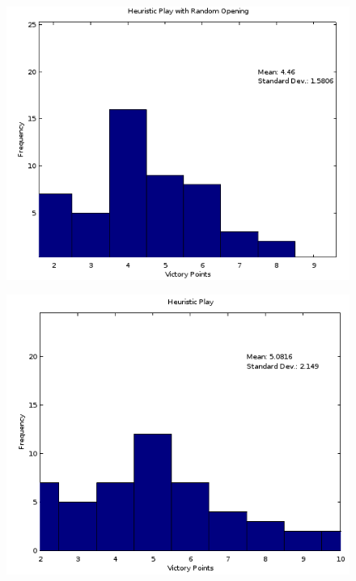 \documentclass[]{article}
\begin{document}
\begin{figure}[H]
\centering
\begin{minipage}{.5\textwidth}
  \centering
  \includegraphics[width=.9\linewidth]{figures/roHeuristic}
  \label{fig:opening3}
\end{minipage}%
\begin{minipage}{.5\textwidth}
  \centering
  \includegraphics[width=.9\linewidth]{figures/hoHeuristic}
  \label{fig:opening4}
\end{minipage}
\end{figure}
\end{document}
